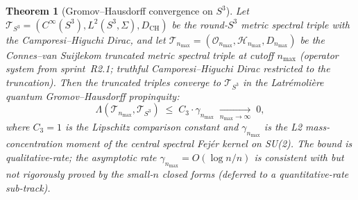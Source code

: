 \documentclass[11pt]{article}
\newtheorem{theorem}{Theorem}
\begin{document}
\begin{theorem}[Gromov--Hausdorff convergence on $S^3$]
\label{thm:gh_convergence}
Let $\mathcal{T}_{S^3} = (C^\infty(S^3), L^2(S^3, \Sigma), D_{\mathrm{CH}})$
be the round-$S^3$ metric spectral triple with the Camporesi--Higuchi
Dirac, and let $\mathcal{T}_{n_{\max}} = (\mathcal{O}_{n_{\max}},
\mathcal{H}_{n_{\max}}, D_{n_{\max}})$ be the Connes--van Suijlekom
truncated metric spectral triple at cutoff $n_{\max}$ (operator system
from sprint~R2.1; truthful Camporesi--Higuchi Dirac restricted to the
truncation).  Then the truncated triples converge to $\mathcal{T}_{S^3}$
in the Latr{\'e}moli{\`e}re quantum Gromov--Hausdorff propinquity:
$$
   \Lambda(\mathcal{T}_{n_{\max}}, \mathcal{T}_{S^3})
   \;\le\; C_3 \cdot \gamma_{n_{\max}}
   \;\xrightarrow[n_{\max}\to\infty]{}\; 0,
$$
where $C_3 = 1$ is the Lipschitz comparison constant and
$\gamma_{n_{\max}}$ is the L2 mass-concentration moment of the central
spectral Fej{\'e}r kernel on SU(2).  The bound is qualitative-rate;
the asymptotic rate $\gamma_{n_{\max}} = O(\log n / n)$ is consistent
with but not rigorously proved by the small-$n$ closed forms (deferred
to a quantitative-rate sub-track).
\end{theorem}
\end{document}
